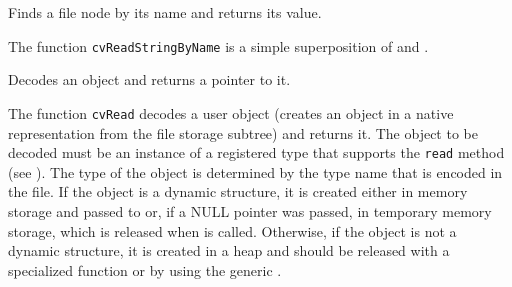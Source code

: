 \label{ReadStringByName}

Finds a file node by its name and returns its value.


\begin{description}
\end{description}

The function \texttt{cvReadStringByName} is a simple superposition of  and .

\label{Read}

Decodes an object and returns a pointer to it.


\begin{description}
\end{description}

The function \texttt{cvRead} decodes a user object (creates an object in a
native representation from the file storage subtree) and returns it. The
object to be decoded must be an instance of a registered type that supports the
\texttt{read} method (see ). The type of the object is
determined by the type name that is encoded in the file. If the object
is a dynamic structure, it is created either in memory storage and passed to
 or, if a NULL pointer was passed, in temporary
memory storage, which is released when  is
called. Otherwise, if the object is not a dynamic structure, it is
created in a heap and should be released with a specialized function or by
using the generic .

